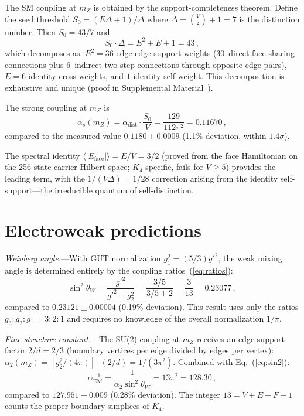 \documentclass[aps,prl,twocolumn,superscriptaddress,showpacs]{revtex4-2}
\begin{document}
The SM coupling at $m_Z$ is obtained by the support-completeness
theorem. Define the seed threshold $S_0 = (E\Delta + 1)/\Delta$
where $\Delta = \binom{V}{2} + 1 = 7$ is the distinction number.
Then $S_0 = 43/7$ and
\begin{equation}
S_0 \cdot \Delta = E^2 + E + 1 = 43 \,,
\label{eq:43}
\end{equation}
which decomposes as: $E^2 = 36$ edge-edge support weights
(30~direct face-sharing connections plus 6~indirect two-step
connections through opposite edge pairs), $E = 6$ identity-cross
weights, and $1$ identity-self weight. This decomposition is
exhaustive and unique (proof in Supplemental Material~\cite{SM}).

The strong coupling at $m_Z$ is
\begin{equation}
\boxed{\alpha_s(m_Z) = \alpha_{\mathrm{dist}} \cdot \frac{S_0}{V}
= \frac{129}{112\pi^2} = 0.11670} \,,
\label{eq:alpha_s}
\end{equation}
compared to the measured value $0.1180 \pm 0.0009$
(1.1\% deviation, within $1.4\sigma$).

The spectral identity $\langle |E_{\mathrm{face}}| \rangle = E/V
= 3/2$ (proved from the face Hamiltonian on the 256-state carrier
Hilbert space; $K_4$-specific, fails for $V \geq 5$) provides
the leading term, with the $1/(V\Delta) = 1/28$ correction arising
from the identity self-support---the irreducible quantum of
self-distinction.


\section{Electroweak predictions}

\textit{Weinberg angle.}---With GUT normalization
$g_1^2 = (5/3)g'^2$, the weak mixing angle is determined
entirely by the coupling ratios~(\ref{eq:ratios}):
\begin{equation}
\boxed{\sin^2\theta_W = \frac{g'^2}{g'^2 + g_2^2}
= \frac{3/5}{3/5 + 2} = \frac{3}{13} = 0.23077} \,,
\label{eq:sin2}
\end{equation}
compared to $0.23121 \pm 0.00004$ (0.19\% deviation).
This result uses only the ratios $g_3 : g_2 : g_1 = 3:2:1$ and
requires no knowledge of the overall normalization $1/\pi$.

\textit{Fine structure constant.}---The SU(2) coupling at $m_Z$
receives an edge support factor $2/d = 2/3$ (boundary vertices per
edge divided by edges per vertex):
$\alpha_2(m_Z) = [g_2^2/(4\pi)] \cdot (2/d) = 1/(3\pi^2)$.
Combined with Eq.~(\ref{eq:sin2}):
\begin{equation}
\boxed{\alpha_{\mathrm{EM}}^{-1} = \frac{1}{\alpha_2 \sin^2\theta_W}
= 13\pi^2 = 128.30} \,,
\label{eq:alpha_em}
\end{equation}
compared to $127.951 \pm 0.009$ (0.28\% deviation). The integer
$13 = V + E + F - 1$ counts the proper boundary simplices of $K_4$.
\end{document}
